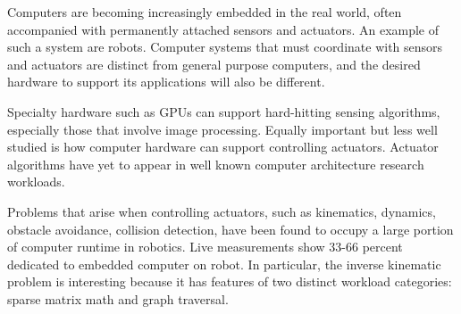 Computers are becoming increasingly embedded in the real world, often accompanied with permanently attached sensors and actuators. An example of such a system are robots. Computer systems that must coordinate with sensors and actuators are distinct from general purpose computers, and the desired hardware to support its applications will also be different.

Specialty hardware such as GPUs can support hard-hitting sensing algorithms, especially those that involve image processing. Equally important but less well studied is how computer hardware can support controlling actuators. Actuator algorithms have yet to appear in well known computer architecture research workloads.

Problems that arise when controlling actuators, such as kinematics, dynamics, obstacle avoidance, collision detection, have been found to occupy a large portion of computer runtime in robotics. Live measurements show 33-66 percent dedicated to embedded computer on robot. In particular, the inverse kinematic problem is interesting because it has features of two distinct workload categories: sparse matrix math and graph traversal.